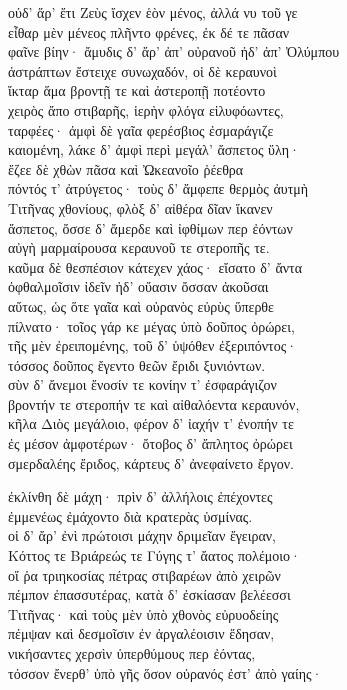 \quad{}οὐδ' ἄρ' ἔτι Ζεὺς ἴσχεν ἑὸν μένος, ἀλλά νυ τοῦ γε\\
εἶθαρ μὲν μένεος πλῆντο φρένες, ἐκ δέ τε πᾶσαν\\
φαῖνε βίην· ἄμυδις δ' ἄρ' ἀπ' οὐρανοῦ ἠδ' ἀπ' Ὀλύμπου \\
ἀστράπτων ἔστειχε συνωχαδόν, οἱ δὲ κεραυνοὶ  \\
ἴκταρ ἅμα βροντῇ τε καὶ ἀστεροπῇ ποτέοντο\\
χειρὸς ἄπο στιβαρῆς, ἱερὴν φλόγα εἰλυφόωντες, \\
ταρφέες· ἀμφὶ δὲ γαῖα φερέσβιος ἐσμαράγιζε \\
καιομένη, λάκε δ' ἀμφὶ περὶ μεγάλ' ἄσπετος ὕλη·\\
ἔζεε δὲ χθὼν πᾶσα καὶ Ὠκεανοῖο ῥέεθρα \\
πόντός τ' ἀτρύγετος· τοὺς δ' ἄμφεπε θερμὸς ἀυτμὴ \\
Τιτῆνας χθονίους, φλὸξ δ' αἰθέρα δῖαν ἵκανεν\\
ἄσπετος, ὄσσε δ' ἄμερδε καὶ ἰφθίμων περ ἐόντων\\
αὐγὴ μαρμαίρουσα κεραυνοῦ τε στεροπῆς τε.\\
καῦμα δὲ θεσπέσιον κάτεχεν χάος· εἴσατο δ' ἄντα  \\
ὀφθαλμοῖσιν ἰδεῖν ἠδ' οὔασιν ὄσσαν ἀκοῦσαι\\
αὔτως, ὡς ὅτε γαῖα καὶ οὐρανὸς εὐρὺς ὕπερθε \\
πίλνατο· τοῖος γάρ κε μέγας ὑπὸ δοῦπος ὀρώρει, \\
τῆς μὲν ἐρειπομένης, τοῦ δ' ὑψόθεν ἐξεριπόντος· \\
τόσσος δοῦπος ἔγεντο θεῶν ἔριδι ξυνιόντων. \\
σὺν δ' ἄνεμοι ἔνοσίν τε κονίην τ' ἐσφαράγιζον\\
βροντήν τε στεροπήν τε καὶ αἰθαλόεντα κεραυνόν,\\
κῆλα Διὸς μεγάλοιο, φέρον δ' ἰαχήν τ' ἐνοπήν τε\\
ἐς μέσον ἀμφοτέρων· ὄτοβος δ' ἄπλητος ὀρώρει \\
σμερδαλέης ἔριδος, κάρτευς δ' ἀνεφαίνετο ἔργον. 

\quad{}ἐκλίνθη δὲ μάχη· πρὶν δ' ἀλλήλοις ἐπέχοντες \\
ἐμμενέως ἐμάχοντο διὰ κρατερὰς ὑσμίνας.\\
οἱ δ' ἄρ' ἐνὶ πρώτοισι μάχην δριμεῖαν ἔγειραν, \\
Κόττος τε Βριάρεώς τε Γύγης τ' ἄατος πολέμοιο·\\
οἵ ῥα τριηκοσίας πέτρας στιβαρέων ἀπὸ χειρῶν  \\
πέμπον ἐπασσυτέρας, κατὰ δ' ἐσκίασαν βελέεσσι\\
Τιτῆνας· καὶ τοὺς μὲν ὑπὸ χθονὸς εὐρυοδείης \\
πέμψαν καὶ δεσμοῖσιν ἐν ἀργαλέοισιν ἔδησαν,\\
νικήσαντες χερσὶν ὑπερθύμους περ ἐόντας, \\
τόσσον ἔνερθ' ὑπὸ γῆς ὅσον οὐρανός ἐστ' ἀπὸ γαίης·  

